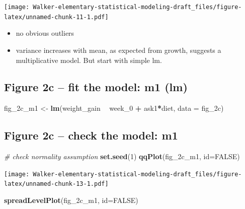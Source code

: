 \documentclass[]{book}
\newenvironment{Shaded}{\begin{snugshade}}{\end{snugshade}}
\newcommand{\CommentTok}[1]{\textcolor[rgb]{0.56,0.35,0.01}{\textit{#1}}}
\newcommand{\DataTypeTok}[1]{\textcolor[rgb]{0.13,0.29,0.53}{#1}}
\newcommand{\DecValTok}[1]{\textcolor[rgb]{0.00,0.00,0.81}{#1}}
\newcommand{\KeywordTok}[1]{\textcolor[rgb]{0.13,0.29,0.53}{\textbf{#1}}}
\newcommand{\NormalTok}[1]{#1}
\newcommand{\OperatorTok}[1]{\textcolor[rgb]{0.81,0.36,0.00}{\textbf{#1}}}
\newcommand{\OtherTok}[1]{\textcolor[rgb]{0.56,0.35,0.01}{#1}}
\newcommand{\StringTok}[1]{\textcolor[rgb]{0.31,0.60,0.02}{#1}}
\providecommand{\tightlist}{%
  \setlength{\itemsep}{0pt}\setlength{\parskip}{0pt}}
\begin{document}
\texttt{[image: Walker-elementary-statistical-modeling-draft\_files/figure-latex/unnamed-chunk-11-1.pdf]}

\begin{itemize}
\tightlist
\item
  no obvious outliers
\item
  variance increases with mean, as expected from growth, suggests a multiplicative model. But start with simple lm.
\end{itemize}

\hypertarget{figure-2c-fit-the-model-m1-lm}{%
\subsection{Figure 2c -- fit the model: m1 (lm)}\label{figure-2c-fit-the-model-m1-lm}}

\begin{Shaded}
\begin{Highlighting}[]
\NormalTok{fig_2c_m1 <-}\StringTok{ }\KeywordTok{lm}\NormalTok{(weight_gain }\OperatorTok{~}\StringTok{ }\NormalTok{week_}\DecValTok{0} \OperatorTok{+}\StringTok{ }\NormalTok{ask1}\OperatorTok{*}\NormalTok{diet, }\DataTypeTok{data =}\NormalTok{ fig_2c)}
\end{Highlighting}
\end{Shaded}

\hypertarget{figure-2c-check-the-model-m1}{%
\subsection{Figure 2c -- check the model: m1}\label{figure-2c-check-the-model-m1}}

\begin{Shaded}
\begin{Highlighting}[]
\CommentTok{# check normality assumption}
\KeywordTok{set.seed}\NormalTok{(}\DecValTok{1}\NormalTok{)}
\KeywordTok{qqPlot}\NormalTok{(fig_2c_m1, }\DataTypeTok{id=}\OtherTok{FALSE}\NormalTok{)}
\end{Highlighting}
\end{Shaded}

\texttt{[image: Walker-elementary-statistical-modeling-draft\_files/figure-latex/unnamed-chunk-13-1.pdf]}

\begin{Shaded}
\begin{Highlighting}[]
\KeywordTok{spreadLevelPlot}\NormalTok{(fig_2c_m1, }\DataTypeTok{id=}\OtherTok{FALSE}\NormalTok{)}
\end{Highlighting}
\end{Shaded}
\end{document}
